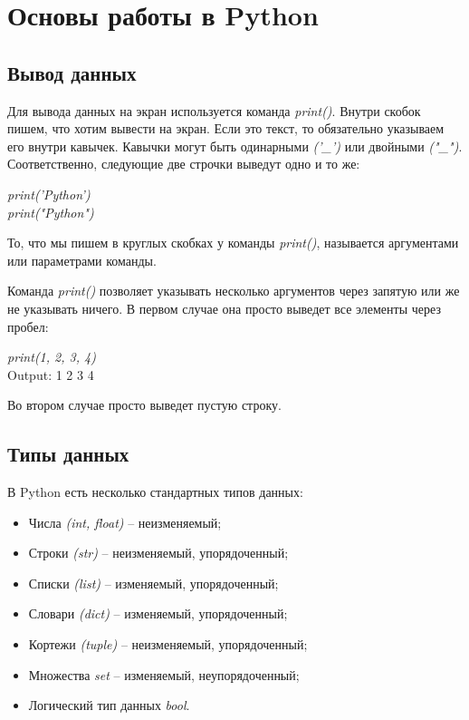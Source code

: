 \newpage
{}
\section*{Основы работы в Python}

\subsection*{Вывод данных}	

Для вывода данных на экран используется команда \colorbox[rgb]{0.95, 0.95, 0.95}{\textit{print()}}. Внутри скобок пишем, что хотим вывести на экран. Если это текст, то обязательно указываем его внутри кавычек. Кавычки могут быть одинарными \textit{('\_')} или двойными \textit{("\_")}. Соответственно, следующие две строчки выведут одно и то же:

\begin{flushleft}
	\colorbox[rgb]{0.95, 0.95, 0.95}{\textit{print('Python')}} \\
	\colorbox[rgb]{0.95, 0.95, 0.95}{\textit{print("Python")}}
\end{flushleft}

То, что мы пишем в круглых скобках у команды \colorbox[rgb]{0.95, 0.95, 0.95}{\textit{print()}}, называется аргументами или параметрами команды.

Команда \colorbox[rgb]{0.95, 0.95, 0.95}{\textit{print()}} позволяет указывать несколько аргументов через запятую или же не указывать ничего. В первом случае она просто выведет все элементы через пробел:

\begin{flushleft}
	\colorbox[rgb]{0.95, 0.95, 0.95}{\textit{print(1, 2, 3, 4)}} \\
	\colorbox[rgb]{0.95, 0.95, 0.95}{Output: 1 2 3 4}
\end{flushleft}

Во втором случае просто выведет пустую строку.


\subsection*{Типы данных}

В Python есть несколько стандартных типов данных:

\begin{itemize}
	\setlength\itemsep{0.01cm}
	\item Числа \textit{(int, float)} -- неизменяемый;
	\item Строки \textit{(str)} -- неизменяемый, упорядоченный;
	\item Списки \textit{(list)} -- изменяемый, упорядоченный;
	\item Словари \textit{(dict)} -- изменяемый, упорядоченный;
	\item Кортежи \textit{(tuple)} -- неизменяемый, упорядоченный;
	\item Множества \textit{set} -- изменяемый, неупорядоченный;
	\item Логический тип данных \textit{bool}.
\end{itemize}

